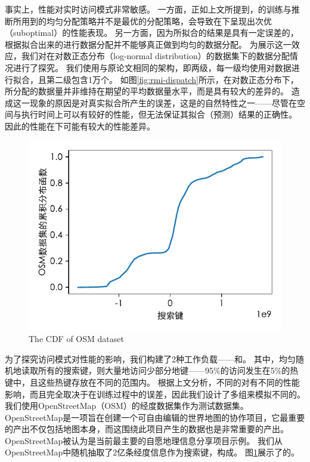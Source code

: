 事实上，{\li}性能对实时访问模式非常敏感。
一方面，正如上文所提到，{\rmi}的训练与推断所用到的均匀分配策略并不是最优的分配策略，会导致在{\skewacc}下呈现出次优（suboptimal）的性能表现。
另一方面，因为{\rmi}所拟合的{\cdf}结果是具有一定误差的，根据拟合出来的{\cdf}进行数据分配并不能够真正做到均匀的数据分配。
为展示这一效应，我们对{\rmi}在对数正态分布（log-normal distribution）的数据集下的数据分配情况进行了探究。
我们使用与原论文相同的{\rmi}架构，即两级{\rmi}，每一级均使用{\lr}对数据进行拟合，且第二级包含1万个{\model}。
如图\ref{fig:rmi-dispatch}所示，在对数正态分布下，{\model}所分配的数据量并非维持在期望的平均数据量水平，而是具有较大的差异的。
造成这一现象的原因是{\model}对真实{\cdf}拟合所产生的误差，这是{\model}的自然特性之一{------}尽管{\model}在空间与执行时间上可以有较好的性能，但{\model}无法保证其拟合（预测）结果的正确性。
因此{\rmi}的性能在{\skewacc}下可能有较大的性能差异。


\begin{figure}[!ht]
  \centering
  \includegraphics{figure/osm-cdf.pdf}
    {The CDF of OSM dataset}
  \label{fig:osm-cdf}
\end{figure}

为了探究访问模式对{\li}性能的影响，我们构建了2种工作负载{------}{\uniwl}和{\skewwl}。
其中，{\uniwl}均匀随机地读取所有的搜索键，{\skewwl}则大量地访问少部分地键{------}95\%的访问发生在5\%的热键中，且这些热键存放在不同的范围内。
根据上文分析，不同的{\skewacc}对{\rmi}有不同的性能影响，而且完全取决于{\model}在训练过程中的误差，因此我们设计了多组{\skewwl}来模拟不同的{\skewacc}。
我们使用OpenStreetMap\cite{osm}（OSM）的经度数据集作为测试数据集。
OpenStreetMap是一项旨在创建一个可自由编辑的世界地图的协作项目，它最重要的产出不仅包括地图本身，而这围绕此项目产生的数据也是非常重要的产出。
OpenStreetMap被认为是当前最主要的自愿地理信息分享项目示例。
我们从OpenStreetMap中随机抽取了2亿条经度信息作为搜索键，构成{\osm}。
图\ref{fig:osm-cdf}展示了{\osm}的{\cdf}。

